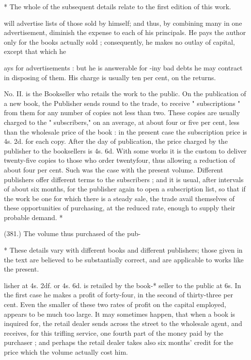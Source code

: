 \documentclass{article}
\begin{document}
* The whole of the subsequent details relate to the first edition of this work.


will advertise lists of those sold by himself; and thus, by combining many in one advertisement, diminish the expense to each of his principals. He pays the author only for the books actually sold ; consequently, he makes no outlay of capital, except that which he


ays for advertisements : but he is answerable for -iny bad debts he may contract in disposing of them. His charge is usually ten per cent, on the returns.


No. II. is the Bookseller who retails the work to the public. On the publication of a new book, the Publisher sends round to the trade, to receive " subscriptions " from them for any number of copies not less than two. These copies are usually charged to the " subscribers," on an average, at about four or five per cent, less than the wholesale price of the book : in the present case the subscription price is 4s. 2d. for each copy. After the day of publication, the price charged by the publisher to the booksellers is 4s. 6d. With some works it is the custom to deliver twenty-five copies to those who order twentyfour, thus allowing a reduction of about four per cent. Such was the case with the present volume. Different publishers offer different terms to the subscribers ; and it is usual, after intervals of about six months, for the publisher again to open a subscription list, so that if the work be one for which there is a steady sale, the trade avail themselves of these opportunities of purchasing, at the reduced rate, enough to supply their probable demand. *


(381.) The volume thus purchased of the pub-


* These details vary with different books and different publishers; those given in the text are believed to be substantially correct, and are applicable to works like the present.


lisher at 4s. 2df. or 4s. 6d. is retailed by the book-* seller to the public at 6s. In the first case he makes a profit of forty-four, in the second of thirty-three per cent. Even the smaller of these two rates of profit on the capital employed, appears to be much too large. It may sometimes happen, that when a book is inquired for, the retail dealer sends across the street to the wholesale agent, and receives, for this trifling service, one fourth part of the money paid by the purchaser ; and perhaps the retail dealer takes also six months' credit for the price which the volume actually cost him.
\end{document}
